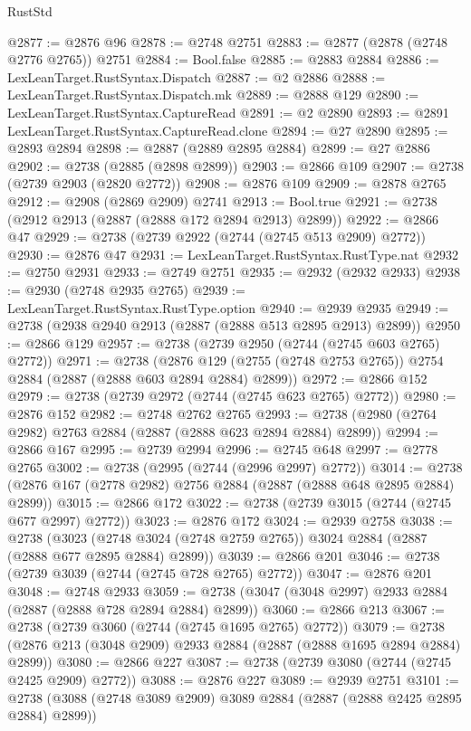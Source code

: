 \begin{lexlean}{RustStd}
\begin{coremodule}
@2877 := @2876 @96
@2878 := @2748 @2751
@2883 := @2877 (@2878 (@2748 @2776 @2765)) @2751
@2884 := Bool.false
@2885 := @2883 @2884
@2886 := LexLeanTarget.RustSyntax.Dispatch
@2887 := @2 @2886
@2888 := LexLeanTarget.RustSyntax.Dispatch.mk
@2889 := @2888 @129
@2890 := LexLeanTarget.RustSyntax.CaptureRead
@2891 := @2 @2890
@2893 := @2891 LexLeanTarget.RustSyntax.CaptureRead.clone
@2894 := @27 @2890
@2895 := @2893 @2894
@2898 := @2887 (@2889 @2895 @2884)
@2899 := @27 @2886
@2902 := @2738 (@2885 (@2898 @2899))
@2903 := @2866 @109
@2907 := @2738 (@2739 @2903 (@2820 @2772))
@2908 := @2876 @109
@2909 := @2878 @2765
@2912 := @2908 (@2869 @2909) @2741
@2913 := Bool.true
@2921 := @2738 (@2912 @2913 (@2887 (@2888 @172 @2894 @2913) @2899))
@2922 := @2866 @47
@2929 := @2738 (@2739 @2922 (@2744 (@2745 @513 @2909) @2772))
@2930 := @2876 @47
@2931 := LexLeanTarget.RustSyntax.RustType.nat
@2932 := @2750 @2931
@2933 := @2749 @2751
@2935 := @2932 (@2932 @2933)
@2938 := @2930 (@2748 @2935 @2765)
@2939 := LexLeanTarget.RustSyntax.RustType.option
@2940 := @2939 @2935
@2949 := @2738 (@2938 @2940 @2913 (@2887 (@2888 @513 @2895 @2913) @2899))
@2950 := @2866 @129
@2957 := @2738 (@2739 @2950 (@2744 (@2745 @603 @2765) @2772))
@2971 := @2738
    (@2876 @129 (@2755 (@2748 @2753 @2765)) @2754 @2884 (@2887 (@2888 @603 @2894 @2884) @2899))
@2972 := @2866 @152
@2979 := @2738 (@2739 @2972 (@2744 (@2745 @623 @2765) @2772))
@2980 := @2876 @152
@2982 := @2748 @2762 @2765
@2993 := @2738 (@2980 (@2764 @2982) @2763 @2884 (@2887 (@2888 @623 @2894 @2884) @2899))
@2994 := @2866 @167
@2995 := @2739 @2994
@2996 := @2745 @648
@2997 := @2778 @2765
@3002 := @2738 (@2995 (@2744 (@2996 @2997) @2772))
@3014 := @2738 (@2876 @167 (@2778 @2982) @2756 @2884 (@2887 (@2888 @648 @2895 @2884) @2899))
@3015 := @2866 @172
@3022 := @2738 (@2739 @3015 (@2744 (@2745 @677 @2997) @2772))
@3023 := @2876 @172
@3024 := @2939 @2758
@3038 := @2738
    (@3023 (@2748 @3024 (@2748 @2759 @2765)) @3024 @2884 (@2887 (@2888 @677 @2895 @2884) @2899))
@3039 := @2866 @201
@3046 := @2738 (@2739 @3039 (@2744 (@2745 @728 @2765) @2772))
@3047 := @2876 @201
@3048 := @2748 @2933
@3059 := @2738 (@3047 (@3048 @2997) @2933 @2884 (@2887 (@2888 @728 @2894 @2884) @2899))
@3060 := @2866 @213
@3067 := @2738 (@2739 @3060 (@2744 (@2745 @1695 @2765) @2772))
@3079 := @2738 (@2876 @213 (@3048 @2909) @2933 @2884 (@2887 (@2888 @1695 @2894 @2884) @2899))
@3080 := @2866 @227
@3087 := @2738 (@2739 @3080 (@2744 (@2745 @2425 @2909) @2772))
@3088 := @2876 @227
@3089 := @2939 @2751
@3101 := @2738 (@3088 (@2748 @3089 @2909) @3089 @2884 (@2887 (@2888 @2425 @2895 @2884) @2899))

\end{coremodule}
\end{lexlean}
